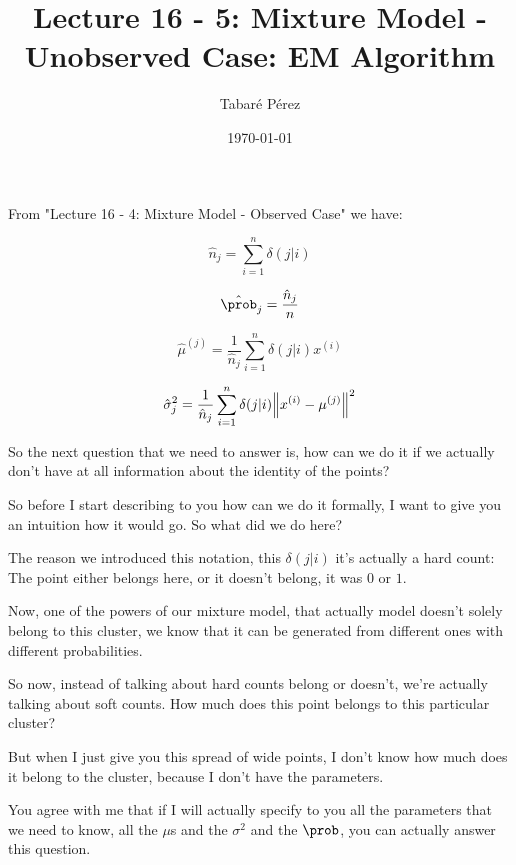 \documentclass[a4paper, 12pt]{article}
\author{Tabaré Pérez}
\date{\today}
\title{Lecture 16 - 5: Mixture Model - Unobserved Case: EM Algorithm}
\begin{document}
\maketitle
From "Lecture 16 - 4: Mixture Model - Observed Case" we have:

\begin{equation}
\label{eq:orgef74bfa}
\hat{n}_j = \sum_{i=1}^{n} \delta(j|i)
\end{equation}

\begin{equation}
\label{eq:org0f5d777}
\hat{\prob}_j = \frac{\hat{n}_j}{n}
\end{equation}

\begin{equation}
\label{eq:orge5b0289}
\hat{\mu}^{(j)} = \frac{1}{\hat{n}_j} \sum_{i=1}^{n} \delta(j|i) x^{(i)}
\end{equation}

\begin{equation}
\label{eq:org524d709}
\hat{\sigma}_{j}^{2} = \frac{1}{\hat{n}_j} \sum_{i=1}^{n} \delta(j|i) \norm{x^{(i)} - \mu^{(j)}}^2
\end{equation}

So the next question that we need to answer is, how can we do it if we actually
don't have at all information about the identity of the points?

So before I start describing to you how can we do it formally, I want to give
you an intuition how it would go. So what did we do here?

The reason we introduced this notation, this \(\delta(j|i)\) it's actually a hard count:
The point either belongs here, or it doesn't belong, it was \(0\) or \(1\).

Now, one of the powers of our mixture model, that actually model doesn't solely
belong to this cluster, we know that it can be generated from different ones
with different probabilities.

So now, instead of talking about hard counts belong or doesn't, we're actually
talking about soft counts. How much does this point belongs to this particular
cluster?

But when I just give you this spread of wide points, I don't know how much does
it belong to the cluster, because I don't have the parameters.

You agree with me that if I will actually specify to you all the parameters that
we need to know, all the \(\mu\)s and the \(\sigma^2\) and the \(\prob\), you
can actually answer this question.
\end{document}
